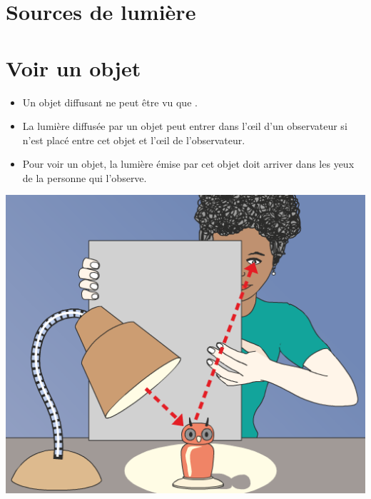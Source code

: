 \documentclass[xcolor={dvipsnames}]{beamer}
\title{}
\author{O. FINOT}\institute{Collège S$^t$ Bernard}
\begin{document}
\begin{frame}
  \titlepage 
\end{frame}

\section{Sources de lumière}



\begin{frame}
	
\end{frame}


\begin{frame}
	
\end{frame}



\section{Voir un objet}

\begin{frame}
	
\end{frame}


\begin{frame}
	\begin{mybilan}
		\begin{itemize}
			\item Un objet diffusant ne peut être vu que .
			\item La lumière diffusée par un objet peut entrer dans l'\oe il d'un observateur si  n'est placé entre cet objet et l'\oe il de l'observateur.
			\item Pour voir un objet, la lumière émise par cet objet doit arriver dans les yeux de la personne qui l'observe.
		\end{itemize}
	
	\end{mybilan}

	\begin{center}
		\includegraphics[scale=0.4]{bilan2}
	\end{center}
\end{frame}
\end{document}
